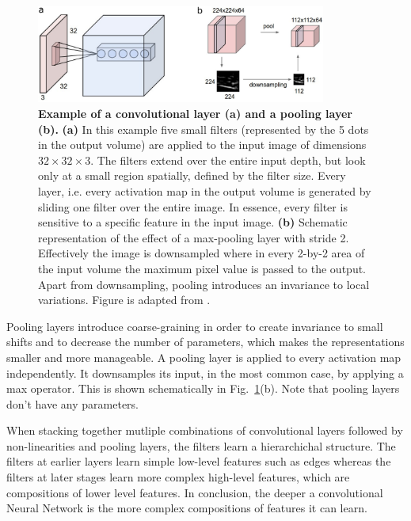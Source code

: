\begin{figure}[h!]
	\centering
	\captionsetup{width=1\linewidth}
	\includegraphics[width=0.85\textwidth]{Figures/conv_pooling.pdf}
	\caption{\textbf{Example of a convolutional layer (a) and a pooling layer (b).} \textbf{(a)} In this example five small filters (represented by the 5 dots in the output volume) are applied to the input image of dimensions $32\times32\times3$. The filters extend over the entire input depth, but look only at a small region spatially, defined by the filter size. Every layer, i.e. every activation map in the output volume is generated by sliding one filter over the entire image. In essence, every filter is sensitive to a specific feature in the input image. \textbf{(b)} Schematic representation of the effect of a max-pooling layer with stride 2. Effectively the image is downsampled where in every 2-by-2 area of the input volume the maximum pixel value is passed to the output. Apart from downsampling, pooling introduces an invariance to local variations. Figure is adapted from \parencite{cs231}.
}
	\label{fig:conv_pooling}
\end{figure}

Pooling layers introduce coarse-graining in order to create invariance to small shifts and to decrease the number of parameters, which makes the representations smaller and more manageable. A pooling layer is applied to every activation map independently. It downsamples its input, in the most common case, by applying a max operator. This is shown schematically in Fig.~\ref{fig:conv_pooling}(b). Note that pooling layers don't have any parameters.

When stacking together mutliple combinations of convolutional layers followed by non-linearities and pooling layers, the filters learn a hierarchichal structure. The filters at earlier layers learn simple low-level features such as edges whereas the filters at later stages learn more complex high-level features, which are compositions of lower level features. In conclusion, the deeper a convolutional Neural Network is the more complex compositions of features it can learn.

